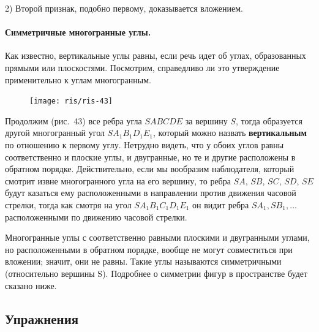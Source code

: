 \documentclass[twoside]{book}
\begin{document}
2) Второй признак, подобно первому, доказывается вложением.

\paragraph{Симметричные многогранные углы.}\label{1938/s53}
Как известно, вертикальные углы равны, если речь идет об углах, образованных прямыми или плоскостями.
Посмотрим, справедливо ли это утверждение применительно к углам многогранным.

\begin{figure}[h!]
\centering
\texttt{[image: ris/ris-43]}
\caption{}
\end{figure}

Продолжим (рис.~43) все ребра угла $SABCDE$ за вершину $S$, тогда образуется другой многогранный угол $SA_1B_1D_1E_1$, который можно назвать \textbf{вертикальным} по отношению к первому углу.
Нетрудно видеть, что у обоих углов равны соответственно и плоские углы, и двугранные, но те и другие расположены в обратном порядке.
Действительно, если мы вообразим наблюдателя, который смотрит извне многогранного угла на его вершину, то ребра $SA$, $SB$, $SC$, $SD$, $SE$ будут казаться ему расположенными в направлении против движения часовой стрелки, тогда как смотря на угол $SA_1B_1C_1D_1E_1$ он видит ребра $SA_1, SB_1,\dots$ расположенными по движению часовой стрелки.

Многогранные углы с соответственно равными плоскими и двугранными углами, но расположенными в обратном порядке, вообще не могут совместиться при вложении;
значит, они не равны.
Такие углы называются симметричными (относительно вершины S).
Подробнее о симметрии фигур в пространстве будет сказано ниже.

\subsection*{Упражнения}

\end{document}
